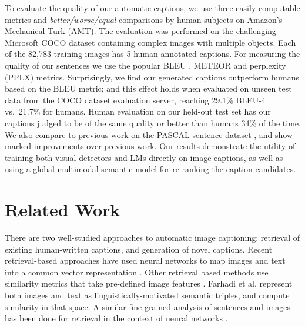 \documentclass[10pt,twocolumn,letterpaper]{article}
\begin{document}
To evaluate the quality of our automatic captions, we use three easily computable metrics and {\it better/worse/equal} comparisons by human subjects on Amazon's Mechanical Turk (AMT). The evaluation was performed on the challenging Microsoft COCO dataset \cite{linECCV14,capeval2015} containing complex images with multiple objects. Each of the 82,783 training images has 5 human annotated captions. For measuring the quality of our sentences we use the popular BLEU \cite{papineni2002bleu}, METEOR \cite{banerjee2005meteor} and perplexity (PPLX) metrics. Surprisingly, we find our generated captions outperform humans based on the BLEU metric; and this effect holds when evaluated on unseen test data from the COCO dataset evaluation server, reaching 29.1\% BLEU-4 vs.~21.7\% for humans. Human evaluation on our held-out test set has our captions judged to be of the same quality or better than humans 34\% of the time. We also compare to previous work on the PASCAL sentence dataset \cite{Rashtchian2010}, and show marked improvements over previous work. Our results demonstrate the utility of training both visual detectors and LMs directly on image captions, as well as using a global multimodal semantic model for re-ranking the caption candidates.

\section{Related Work}\label{sec:related}

There are two well-studied approaches to automatic image captioning: retrieval of existing human-written captions, and generation of novel captions. Recent retrieval-based approaches have used neural networks to map images and text into a common vector representation \cite{socher2013grounded}. Other retrieval based methods use similarity metrics that take pre-defined image features \cite{hodosh2013framing,ordonez2011im2text}. Farhadi et al. \cite{farhadi2010every} represent both images and text as linguistically-motivated semantic triples, and compute similarity in that space. A similar fine-grained analysis of sentences and images has been done for retrieval in the context of neural networks \cite{karpathy2014deep}.
\end{document}
